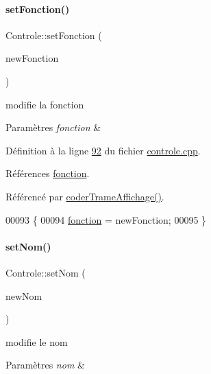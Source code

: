 \paragraph{\texorpdfstring{set\+Fonction()}{setFonction()}}
{\footnotesize\ttfamily Controle\+::set\+Fonction (\begin{DoxyParamCaption}\item[{Q\+String}]{new\+Fonction }\end{DoxyParamCaption})}



modifie la fonction 


\begin{DoxyParams}{Paramètres}
{\em fonction} & \\
\hline
\end{DoxyParams}


Définition à la ligne \hyperlink{controle_8cpp_source_l00092}{92} du fichier \hyperlink{controle_8cpp_source}{controle.\+cpp}.



Références \hyperlink{controle_8h_source_l00075}{fonction}.



Référencé par \hyperlink{controle_8cpp_source_l00101}{coder\+Trame\+Affichage()}.


\begin{DoxyCode}
00093 \{
00094     \hyperlink{class_controle_af733c06309ce63fb9157073574e42b00}{fonction} = newFonction;
00095 \}
\end{DoxyCode}
\mbox{\label{class_controle_a0f731cdb733053f7be24e7042611601c}} 
\paragraph{\texorpdfstring{set\+Nom()}{setNom()}}
{\footnotesize\ttfamily Controle\+::set\+Nom (\begin{DoxyParamCaption}\item[{Q\+String}]{new\+Nom }\end{DoxyParamCaption})}



modifie le nom 


\begin{DoxyParams}{Paramètres}
{\em nom} & \\
\hline
\end{DoxyParams}


